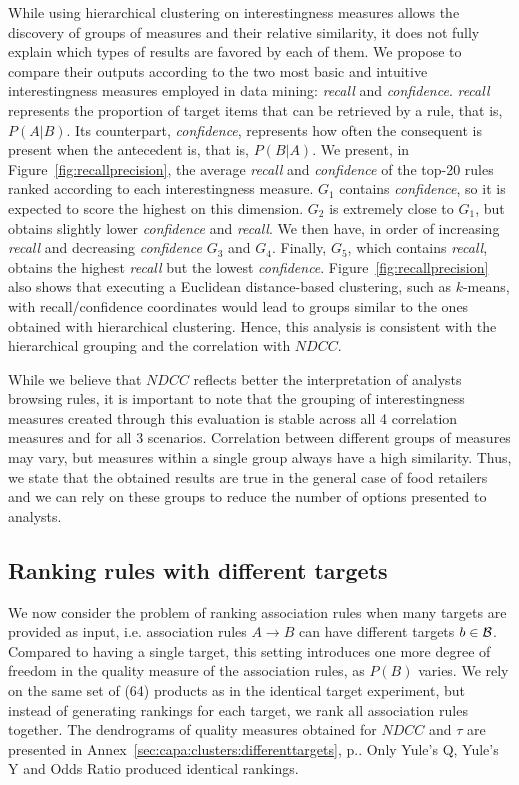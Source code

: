 While using hierarchical clustering on interestingness measures allows the discovery of groups of measures
and their relative similarity, it does not fully explain which types of results are favored by each of them.
We propose to compare their outputs according to the two most basic and intuitive interestingness measures employed in data mining:
{\em recall} and {\em confidence}.
{\em recall} represents the proportion of target items that can be retrieved by a rule, that is,  $P(A|B)$.
Its counterpart, {\em confidence}, represents how often the consequent is present when the antecedent is, that is, $P(B|A)$.
We present, in Figure~\ref{fig:recallprecision}, the average {\em recall} and {\em confidence}
of the top-20 rules ranked according to each interestingness measure.
$G_1$ contains {\em confidence}, so it is expected to score the highest on this dimension.
$G_2$ is extremely close to $G_1$, but obtains slightly lower {\em confidence} and {\em recall}.
We then have, in order of increasing {\em recall} and decreasing {\em confidence} $G_3$ and $G_4$.
Finally, $G_5$, which contains {\em recall}, obtains the highest {\em recall} but the lowest {\em confidence}.
Figure~\ref{fig:recallprecision} also shows that executing a Euclidean distance-based clustering,
 such as $k$-means, with recall/confidence coordinates would lead to groups similar to the ones obtained with hierarchical clustering.
Hence, this analysis is consistent with the hierarchical grouping and the correlation with $\mathit{NDCC}$.

While we believe that $\mathit{NDCC}$ reflects better the interpretation of analysts browsing rules,
it is important to note that the grouping of interestingness measures created through this evaluation
is stable across all 4 correlation measures and for all 3 scenarios.
Correlation between different groups of measures may vary, but measures within a single group always have a high similarity.
Thus, we state that the obtained results are true in the general case of food retailers
and we can rely on these groups to reduce the number of options presented to analysts.



\subsection{Ranking rules with  different targets}
\label{sec:differenttargets}
We now consider the problem of ranking association rules when many targets are provided as input,
i.e. association rules $A \rightarrow B$ can have different targets $b \in {\cal B}$.
Compared to having a single target,
this setting introduces one more degree of freedom in the quality measure of the association rules,
as $P(B)$ varies.
We rely on the same set of (64) products as in the identical target experiment,
but instead of generating rankings for each target, we rank all association rules together.
The dendrograms of quality measures obtained for $\mathit{NDCC}$ and $\tau$ are presented in
Annex~\ref{sec:capa:clusters:differenttargets}, p.\pageref{sec:capa:clusters:differenttargets}.
Only Yule's Q, Yule's Y and Odds Ratio produced identical rankings.

